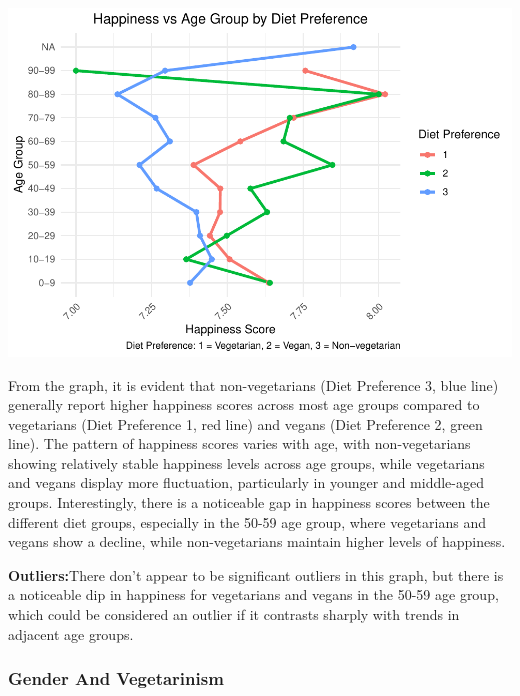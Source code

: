 \documentclass[
]{article}
\begin{document}
\includegraphics{Final-v2_files/figure-latex/Age~analysis-1.pdf}

From the graph, it is evident that non-vegetarians (Diet Preference 3,
blue line) generally report higher happiness scores across most age
groups compared to vegetarians (Diet Preference 1, red line) and vegans
(Diet Preference 2, green line). The pattern of happiness scores varies
with age, with non-vegetarians showing relatively stable happiness
levels across age groups, while vegetarians and vegans display more
fluctuation, particularly in younger and middle-aged groups.
Interestingly, there is a noticeable gap in happiness scores between the
different diet groups, especially in the 50-59 age group, where
vegetarians and vegans show a decline, while non-vegetarians maintain
higher levels of happiness.

\textbf{Outliers:}There don't appear to be significant outliers in this
graph, but there is a noticeable dip in happiness for vegetarians and
vegans in the 50-59 age group, which could be considered an outlier if
it contrasts sharply with trends in adjacent age groups.

\subsubsection{Gender And Vegetarinism}\label{gender-and-vegetarinism}
\end{document}
